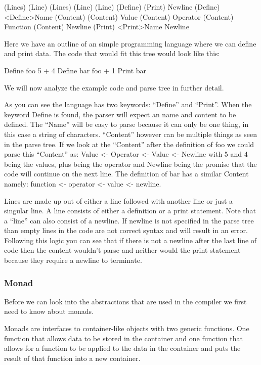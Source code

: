 \begin{code}
	(Lines) 
		(Line) (Lines) 
		(Line) 
	(Line) 
		(Define) 
		(Print) 
		Newline 
	(Define) 
		<Define>Name (Content)
	(Content) 
		Value (Content) 
		Operator (Content) 
		Function (Content) 
		Newline 
	(Print) 
		<Print>Name Newline
\end{code}

Here we have an outline of an simple programming language where we can define and print data. The code that would fit this tree would look like this: 


\begin{code}
	Define foo 5 + 4 
	Define bar foo + 1 
	Print bar 
\end{code}


We will now analyze the example code and parse tree in further detail. 

As you can see the language has two keywords: “Define” and “Print”. When the keyword Define is found, the parser will expect an name and content to be defined. The “Name” will be easy to parse because it can only be one thing, in this case a string of characters. “Content” however can be multiple things as seen in the parse tree. If we look at the “Content” after the definition of foo we could parse this “Content” as: Value <- Operator <- Value <- Newline with 5 and 4 being the values, plus being the operator and Newline being the promise that the code will continue on the next line. The definition of bar has a similar Content namely: function <- operator <- value <- newline. 

Lines are made up out of either a line followed with another line or just a singular line. A line consists of either a definition or a print statement. Note that a “line” can also consist of a newline. If newline is not specified in the parse tree than empty lines in the code are not correct syntax and will result in an error. Following this logic you can see that if there is not a newline after the last line of code then the content wouldn’t parse and neither would the print statement because they require a newline to terminate.

\subsubsection{Monad}

Before we can look into the abstractions that are used in the compiler we first need to know about monads.

Monads are interfaces to container-like objects with two generic functions. One function that allows data to be stored in the container and one function that allows for a function to be applied to the data in the container and puts the result of that function into a new container.

